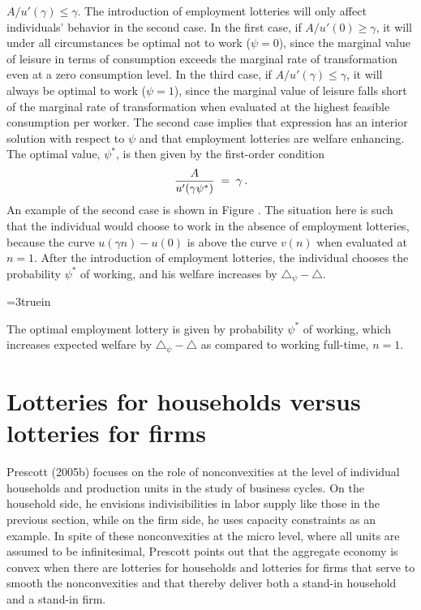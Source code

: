  $A/u'(\gamma) \leq \gamma$.
\medskip
\noindent
The introduction of employment lotteries will only affect
individuals' behavior in the second case. In the first case,
if $A/u'(0) \geq \gamma$, it will under all circumstances be
optimal not to work ($\psi=0$), since the marginal value of
leisure in terms of consumption exceeds the marginal rate of
transformation even
at a zero consumption level. In the third case, if
$A/u'(\gamma) \leq \gamma$, it will always be optimal to
work ($\psi=1$), since the marginal value of
leisure falls short of the marginal rate of transformation
when evaluated at the highest feasible consumption per worker.
The second case implies that expression  has an
interior solution with respect to $\psi$ and that employment
lotteries are welfare enhancing.
The optimal value, $\psi^*$, is then given by the first-order
condition
$$
{A  \over u'(\gamma \psi^*)}  \;=\; \gamma \,.
$$
An example of the second case is shown in Figure . %
The situation here is such that the individual would choose
to work in the absence of employment lotteries, because the
curve $u(\gamma n) - u(0)$ is above the curve $v(n)$ when
evaluated at $n = 1$. After the introduction of employment
lotteries, the individual chooses the probability $\psi^*$
of working, and his welfare increases by $\triangle_{\psi} -
\triangle$.


\centerline{\epsfxsize=3truein}
\caption{The optimal employment lottery is given by probability $\psi^*$ of working,
which increases expected welfare by  $\triangle_{\psi} - \triangle$ as compared
to working full-time, $n=1$.}
\endfigure
{}


\section{Lotteries for households versus lotteries for firms}\label{sec:lotteries_firms_households}%
%
Prescott (2005b) focuses on the role of nonconvexities at the level of
individual households and production units in the study of business
cycles. On the household side, he envisions indivisibilities in labor
supply like those in the previous section, while on the firm side, he
uses capacity constraints as an example. In spite of these
nonconvexities at the micro level, where all units are assumed to be
infinitesimal, Prescott points out that the
aggregate economy is convex when there are lotteries for
households and lotteries for firms that serve to smooth
the nonconvexities and that thereby deliver both a stand-in
household and a stand-in firm. %

